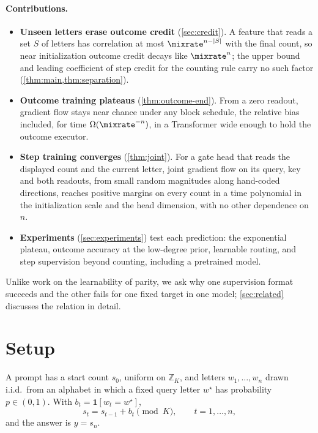 \paragraph{Contributions.}
\begin{itemize}[leftmargin=*,itemsep=2pt,topsep=3pt]
\item \textbf{Unseen letters erase outcome credit} (\cref{sec:credit}). A feature that reads a set $S$ of letters has correlation at most
$\mixrate^{n-|S|}$ with the final count, so near initialization outcome credit decays like $\mixrate^n$; the upper bound and leading coefficient of
step credit for the counting rule carry no such factor (\cref{thm:main,thm:separation}).
\item \textbf{Outcome training plateaus} (\cref{thm:outcome-end}). From a zero readout, gradient flow stays near chance under any block schedule, the relative bias included,
for time $\Omega(\mixrate^{-n})$, in a Transformer wide enough to hold the outcome executor.
\item \textbf{Step training converges} (\cref{thm:joint}). For a gate head that reads the displayed count and the current
letter, joint gradient flow on its query, key and both readouts, from small random magnitudes along hand-coded directions,
reaches positive margins on every count in a time polynomial in the initialization scale and the head dimension, with no other dependence on $n$.
\item \textbf{Experiments} (\cref{sec:experiments}) test each prediction: the exponential plateau, outcome accuracy at the
low-degree prior, learnable routing, and step supervision beyond counting, including a pretrained model.
\end{itemize}

Unlike work on the learnability of parity, we ask why one supervision format succeeds and the other fails for one fixed
target in one model; \cref{sec:related} discusses the relation in detail.

\section{Setup}
\label{sec:setup}
\label{sec:setting}

\begin{definition}
\label{def:task}
A prompt has a start count $s_0$, uniform on $\mathbb Z_K$, and letters $w_1,\ldots,w_n$ drawn i.i.d.\ from an alphabet
in which a fixed query letter $w^\star$ has probability $p\in(0,1)$. With $b_t=\mathbf 1[w_t=w^\star]$,
\begin{equation}
 s_t=s_{t-1}+b_t\pmod K,\qquad t=1,\ldots,n,
 \label{eq:tracking}
\end{equation}
and the answer is $y=s_n$.
\end{definition}

